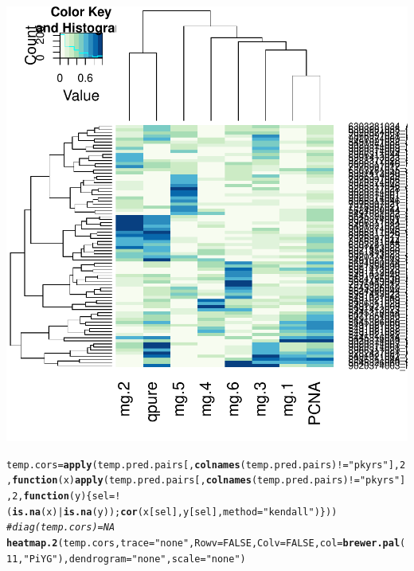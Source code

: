 \documentclass{article}\usepackage[]{graphicx}\usepackage[]{color}
\makeatletter
\def\maxwidth{ %
  \ifdim\Gin@nat@width>\linewidth
    \linewidth
  \else
    \Gin@nat@width
  \fi
}
\newcommand{\hlnum}[1]{\textcolor[rgb]{0.686,0.059,0.569}{#1}}%
\newcommand{\hlstr}[1]{\textcolor[rgb]{0.192,0.494,0.8}{#1}}%
\newcommand{\hlcom}[1]{\textcolor[rgb]{0.678,0.584,0.686}{\textit{#1}}}%
\newcommand{\hlopt}[1]{\textcolor[rgb]{0,0,0}{#1}}%
\newcommand{\hlstd}[1]{\textcolor[rgb]{0.345,0.345,0.345}{#1}}%
\newcommand{\hlkwa}[1]{\textcolor[rgb]{0.161,0.373,0.58}{\textbf{#1}}}%
\newcommand{\hlkwb}[1]{\textcolor[rgb]{0.69,0.353,0.396}{#1}}%
\newcommand{\hlkwc}[1]{\textcolor[rgb]{0.333,0.667,0.333}{#1}}%
\newcommand{\hlkwd}[1]{\textcolor[rgb]{0.737,0.353,0.396}{\textbf{#1}}}%
\newenvironment{kframe}{%
 \def\at@end@of@kframe{}%
 \ifinner\ifhmode%
  \def\at@end@of@kframe{\end{minipage}}%
  \begin{minipage}{\columnwidth}%
 \fi\fi%
 \def\FrameCommand##1{\hskip\@totalleftmargin \hskip-\fboxsep
 \colorbox{shadecolor}{##1}\hskip-\fboxsep
     \hskip-\linewidth \hskip-\@totalleftmargin \hskip\columnwidth}%
 \MakeFramed {\advance\hsize-\width
   \@totalleftmargin\z@ \linewidth\hsize
   \@setminipage}}%
 {\par\unskip\endMakeFramed%
 \at@end@of@kframe}
\newenvironment{knitrout}{}{} %
\makeatother
\begin{document}
\begin{knitrout}
{\centering \includegraphics[width=\maxwidth]{figure/metagene-pairs-5} 

}


\begin{kframe}\begin{alltt}
\hlstd{temp.cors} \hlkwb{=} \hlkwd{apply}\hlstd{(temp.pred.pairs[,}\hlkwd{colnames}\hlstd{(temp.pred.pairs)} \hlopt{!=} \hlstr{"pkyrs"}\hlstd{],} \hlnum{2}\hlstd{,} \hlkwa{function}\hlstd{(}\hlkwc{x}\hlstd{)} \hlkwd{apply}\hlstd{(temp.pred.pairs[,}\hlkwd{colnames}\hlstd{(temp.pred.pairs)} \hlopt{!=} \hlstr{"pkyrs"}\hlstd{],} \hlnum{2}\hlstd{,} \hlkwa{function}\hlstd{(}\hlkwc{y}\hlstd{) \{ sel} \hlkwb{=} \hlopt{!}\hlstd{(}\hlkwd{is.na}\hlstd{(x)} \hlopt{|} \hlkwd{is.na}\hlstd{(y));} \hlkwd{cor}\hlstd{(x[sel], y[sel],} \hlkwc{method} \hlstd{=} \hlstr{"kendall"}\hlstd{) \} ))}
\hlcom{#diag(temp.cors) = NA}
\hlkwd{heatmap.2}\hlstd{(temp.cors,} \hlkwc{trace} \hlstd{=} \hlstr{"none"}\hlstd{,} \hlkwc{Rowv} \hlstd{=} \hlnum{FALSE}\hlstd{,} \hlkwc{Colv} \hlstd{=} \hlnum{FALSE}\hlstd{,} \hlkwc{col} \hlstd{=} \hlkwd{brewer.pal}\hlstd{(}\hlnum{11}\hlstd{,} \hlstr{"PiYG"}\hlstd{),} \hlkwc{dendrogram} \hlstd{=} \hlstr{"none"}\hlstd{,} \hlkwc{scale} \hlstd{=} \hlstr{"none"}\hlstd{)}
\end{alltt}
\end{kframe}


\end{knitrout}
\end{document}
